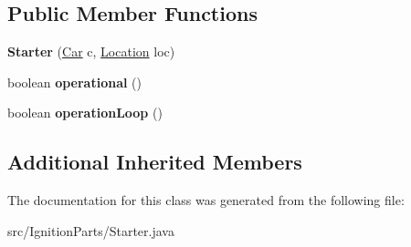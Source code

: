 \subsection*{Public Member Functions}
\begin{DoxyCompactItemize}
\item 
\hypertarget{classIgnitionParts_1_1Starter_a04c10a8d00bb49312bb2265ad5201c24}{}{\bfseries Starter} (\hyperlink{classCars_1_1Car}{Car} c, \hyperlink{enumEnums_1_1Location}{Location} loc)\label{classIgnitionParts_1_1Starter_a04c10a8d00bb49312bb2265ad5201c24}

\item 
\hypertarget{classIgnitionParts_1_1Starter_acb55c8090d71f159be7f4f9e49740906}{}boolean {\bfseries operational} ()\label{classIgnitionParts_1_1Starter_acb55c8090d71f159be7f4f9e49740906}

\item 
\hypertarget{classIgnitionParts_1_1Starter_ab281e11a365fa32cbee68e7c2832c8a0}{}boolean {\bfseries operation\+Loop} ()\label{classIgnitionParts_1_1Starter_ab281e11a365fa32cbee68e7c2832c8a0}

\end{DoxyCompactItemize}
\subsection*{Additional Inherited Members}


The documentation for this class was generated from the following file\+:\begin{DoxyCompactItemize}
\item 
src/\+Ignition\+Parts/Starter.\+java\end{DoxyCompactItemize}
